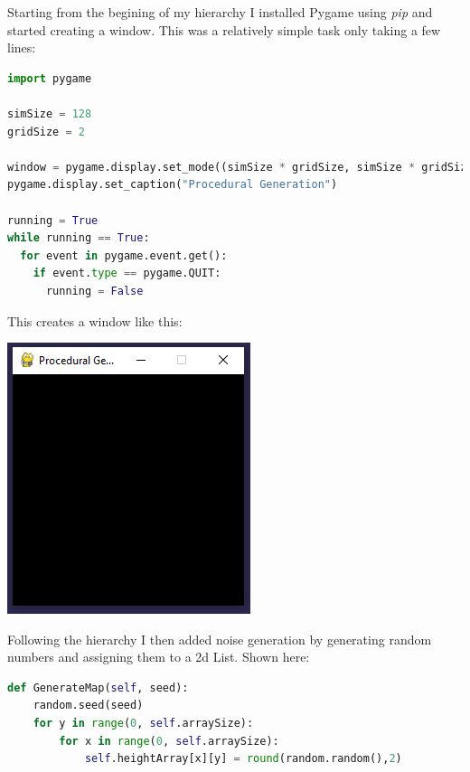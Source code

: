 \begin{flushleft}
\begin{enumerate}
            \vspace{0.5cm}

            Starting from the begining of my hierarchy I installed Pygame using \textit{pip} and started creating a window.
            This was a relatively simple task only taking a few lines:
            \vspace{0.5cm}

            \normalsize
            \begin{lstlisting}[language=Python]
import pygame

simSize = 128
gridSize = 2

window = pygame.display.set_mode((simSize * gridSize, simSize * gridSize))
pygame.display.set_caption("Procedural Generation")

running = True
while running == True:
  for event in pygame.event.get():
    if event.type == pygame.QUIT:
      running = False
            \end{lstlisting}

            \vspace{0.5cm}

            \large
            This creates a window like this: \\ 
            \vspace{0.5cm}
            \centerline{\includegraphics{Images/Prototype/CreateWindowExample.PNG}}

            \vspace{0.5cm}

            Following the hierarchy I then added noise generation by generating random numbers and 
            assigning them to a 2d List. Shown here: 
            
            \normalsize\begin{lstlisting}[language=Python]
def GenerateMap(self, seed):
    random.seed(seed)
    for y in range(0, self.arraySize):
        for x in range(0, self.arraySize):
            self.heightArray[x][y] = round(random.random(),2)
            \end{lstlisting}


\end{enumerate}
\end{flushleft}
